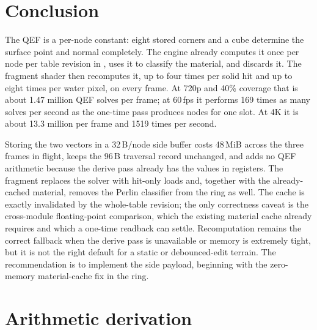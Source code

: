 \documentclass[11pt,a4paper]{article}
\newcommand{\fpath}[1]{\path{#1}}
\theoremstyle{plain}
\theoremstyle{definition}
\theoremstyle{remark}
\begin{document}
\section{Conclusion}

The QEF is a per-node constant: eight stored corners and a cube determine the
surface point and normal completely. The engine already computes it once per
node per table revision in \fpath{OctreeDerive.comp}, uses it to classify the
material, and discards it. The fragment shader then recomputes it, up to four
times per solid hit and up to eight times per water pixel, on every frame.
At 720p and 40\% coverage that is about 1.47 million QEF solves per frame;
at 60\,fps it performs 169 times as many solves per second as the one-time
pass produces nodes for one slot. At 4K it is about 13.3 million per frame and
1519 times per second.

Storing the two vectors in a 32\,B/node side buffer costs 48\,MiB across the
three frames in flight, keeps the 96\,B traversal record unchanged, and adds
no QEF arithmetic because the derive pass already has the values in registers.
The fragment replaces the solver with hit-only loads and, together with the
already-cached material, removes the Perlin classifier from the ring as well.
The cache is exactly invalidated by the whole-table revision; the only
correctness caveat is the cross-module floating-point comparison, which the
existing material cache already requires and which a one-time readback can
settle. Recomputation remains the correct fallback when the derive pass is
unavailable or memory is extremely tight, but it is not the right default for
a static or debounced-edit terrain. The recommendation is to implement the
side payload, beginning with the zero-memory material-cache fix in the ring.

\appendix
\section{Arithmetic derivation}
\end{document}
